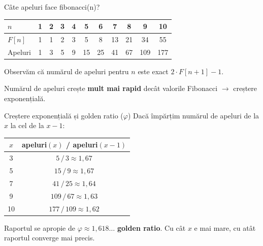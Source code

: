 ﻿\documentclass{beamer}
\begin{document}
\begin{frame}{Câte apeluri face fibonacci(n)?}
  \begin{center}
  \begin{tabular}{lcccccccccc}
    \toprule
    $n$       & 1 & 2 & 3 & 4 & 5  & 6  & 7  & 8  & 9   & 10  \\
    \midrule
    $F[n]$    & 1 & 1 & 2 & 3 & 5  & 8  & 13 & 21 & 34  & 55  \\
    Apeluri   & 1 & 3 & 5 & 9 & 15 & 25 & 41 & 67 & 109 & 177 \\
    \bottomrule
  \end{tabular}
  \end{center}

  \smallskip
  Observăm că numărul de apeluri pentru $n$ este exact $2 \cdot F[n+1] - 1$.

  \smallskip
  Numărul de apeluri crește \textbf{mult mai rapid} decât valorile Fibonacci $\rightarrow$ creștere exponențială.
\end{frame}

\begin{frame}{Creștere exponențială și golden ratio ($\varphi$)}
  Dacă împărțim numărul de apeluri de la $x$ la cel de la $x-1$:

  \smallskip
  \begin{center}
  \begin{tabular}{cc}
    \toprule
    $x$ & apeluri$(x)$ / apeluri$(x-1)$ \\
    \midrule
    3  & $5\,/\,3   \approx 1{,}67$ \\
    5  & $15\,/\,9  \approx 1{,}67$ \\
    7  & $41\,/\,25 \approx 1{,}64$ \\
    9  & $109\,/\,67  \approx 1{,}63$ \\
    10 & $177\,/\,109 \approx 1{,}62$ \\
    \bottomrule
  \end{tabular}
  \end{center}

  \smallskip
  Raportul se apropie de $\varphi \approx 1{,}618\ldots$ \textemdash{} \textbf{golden ratio}. Cu cât $x$ e mai mare, cu atât raportul converge mai precis.
\end{frame}
\end{document}
